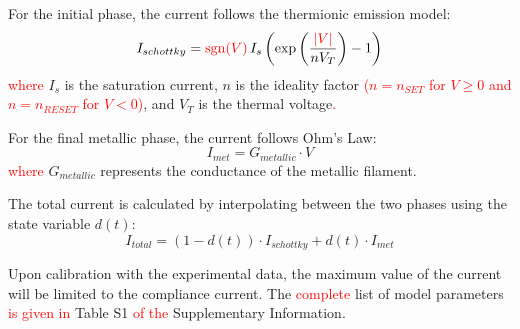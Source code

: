 \documentclass[aip,apl,reprint,floatfix]{revtex4-2}
\newcommand{\changed}[1]{\textcolor{red}{#1}}
\begin{document}
For the initial phase, the current follows the thermionic emission model:
\begin{equation}
    I_{schottky} = \changed{\operatorname{sgn}(V)\,} I_s \left( \exp\left( \frac{\changed{|V|}}{n V_T} \right) - 1 \right)
    \label{eq:schottky}
\end{equation}
\changed{where} $I_s$ is the saturation current, $n$ is the ideality factor \changed{($n = n_{SET}$ for $V \ge 0$ and $n = n_{RESET}$ for $V < 0$)}, and $V_T$ is the thermal voltage\changed{.}

For the final metallic phase, the current follows Ohm's Law:
\begin{equation}
    I_{met} = G_{metallic} \cdot V
\end{equation}
\changed{where} $G_{metallic}$ represents the conductance of the metallic filament.

The total current is calculated by interpolating between the two phases using the state variable $d(t)$:
\begin{equation}
    I_{total} = (1 - d(t)) \cdot I_{schottky} + d(t) \cdot I_{met}
\end{equation}

Upon calibration with the experimental data, the maximum value of the current will be limited to the compliance current. The \changed{complete} list of model parameters \changed{is given in} Table S1 \changed{of the} Supplementary Information.




\end{document}
